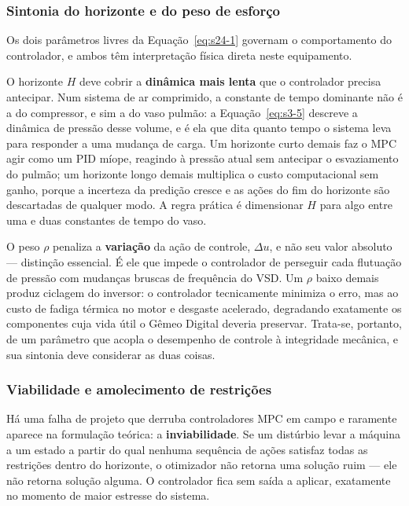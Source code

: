 \documentclass[12pt,a4paper]{article}
\numberwithin{equation}{section}
\numberwithin{table}{section}
\numberwithin{figure}{section}
\begin{document}
	\subsubsection*{Sintonia do horizonte e do peso de esforço}

	Os dois parâmetros livres da Equação~\eqref{eq:s24-1} governam o comportamento do controlador, e ambos têm interpretação física direta neste equipamento.

	O horizonte $H$ deve cobrir a \textbf{dinâmica mais lenta} que o controlador precisa antecipar. Num sistema de ar comprimido, a constante de tempo dominante não é a do compressor, e sim a do vaso pulmão: a Equação~\eqref{eq:s3-5} descreve a dinâmica de pressão desse volume, e é ela que dita quanto tempo o sistema leva para responder a uma mudança de carga. Um horizonte curto demais faz o MPC agir como um PID míope, reagindo à pressão atual sem antecipar o esvaziamento do pulmão; um horizonte longo demais multiplica o custo computacional sem ganho, porque a incerteza da predição cresce e as ações do fim do horizonte são descartadas de qualquer modo. A regra prática é dimensionar $H$ para algo entre uma e duas constantes de tempo do vaso.

	O peso $\rho$ penaliza a \textbf{variação} da ação de controle, $\Delta u$, e não seu valor absoluto — distinção essencial. É ele que impede o controlador de perseguir cada flutuação de pressão com mudanças bruscas de frequência do VSD. Um $\rho$ baixo demais produz ciclagem do inversor: o controlador tecnicamente minimiza o erro, mas ao custo de fadiga térmica no motor e desgaste acelerado, degradando exatamente os componentes cuja vida útil o Gêmeo Digital deveria preservar. Trata-se, portanto, de um parâmetro que acopla o desempenho de controle à integridade mecânica, e sua sintonia deve considerar as duas coisas.

	\subsubsection*{Viabilidade e amolecimento de restrições}

	Há uma falha de projeto que derruba controladores MPC em campo e raramente aparece na formulação teórica: a \textbf{inviabilidade}. Se um distúrbio levar a máquina a um estado a partir do qual nenhuma sequência de ações satisfaz todas as restrições dentro do horizonte, o otimizador não retorna uma solução ruim — ele não retorna solução alguma. O controlador fica sem saída a aplicar, exatamente no momento de maior estresse do sistema.
\end{document}
